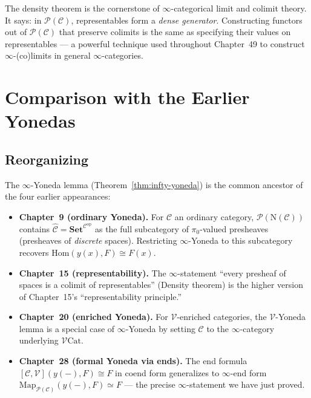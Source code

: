 \begin{remark}
The density theorem is the cornerstone of $\infty$-categorical limit
and colimit theory. It says: in $\mathcal{P}(\mathcal{C})$, representables
form a \emph{dense generator}. Constructing functors out of
$\mathcal{P}(\mathcal{C})$ that preserve colimits is the same as
specifying their values on representables — a powerful technique used
throughout Chapter~49 to construct $\infty$-(co)limits in general
$\infty$-categories.
\end{remark}


\section{Comparison with the Earlier Yonedas}
\label{sec:yoneda-comparison}

\subsection{Reorganizing}

\begin{remark}
\label{rem:yoneda-quartet}
The $\infty$-Yoneda lemma (Theorem~\ref{thm:infty-yoneda}) is the
common ancestor of the four earlier appearances:
\begin{itemize}
  \item \textbf{Chapter~9 (ordinary Yoneda).} For $\mathcal{C}$ an
        ordinary category, $\mathcal{P}(\mathrm{N}(\mathcal{C}))$ contains
        $\widehat{\mathcal{C}} = \mathbf{Set}^{\mathcal{C}^{\mathrm{op}}}$
        as the full subcategory of $\pi_0$-valued presheaves (presheaves
        of \emph{discrete} spaces). Restricting $\infty$-Yoneda to this
        subcategory recovers $\mathrm{Hom}(y(x), F) \cong F(x)$.
  \item \textbf{Chapter~15 (representability).} The $\infty$-statement
        ``every presheaf of spaces is a colimit of representables''
        (Density theorem) is the higher version of Chapter~15's
        ``representability principle.''
  \item \textbf{Chapter~20 (enriched Yoneda).} For $\mathcal{V}$-enriched
        categories, the $\mathcal{V}$-Yoneda lemma is a special case of
        $\infty$-Yoneda by setting $\mathcal{C}$ to the $\infty$-category
        underlying $\mathcal{V}\mathrm{Cat}$.
  \item \textbf{Chapter~28 (formal Yoneda via ends).} The end formula
        $[\mathcal{C}, \mathcal{V}](y(-), F) \cong F$ in coend form
        generalizes to $\infty$-end form
        $\mathrm{Map}_{\mathcal{P}(\mathcal{C})}(y(-), F) \simeq F$
        — the precise $\infty$-statement we have just proved.
\end{itemize}
\end{remark}

